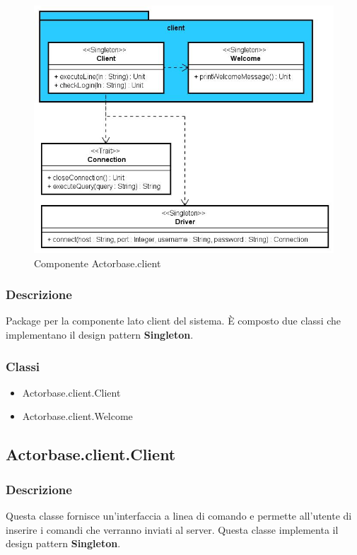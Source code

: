 \documentclass[a4paper]{article}
\begin{document}
			\begin{figure}[H]
				\centering
				\includegraphics[width=\textwidth]{ST/Client/clientLevel.jpg}
				\caption{Componente Actorbase.client}
			\end{figure}
			\subsubsection{Descrizione}
				Package per la componente lato client del sistema. 
				È composto due classi che implementano il design pattern \textbf{Singleton}.
				
			\subsubsection{Classi}
				\begin{itemize}
					\item Actorbase.client.Client
					\item Actorbase.client.Welcome
				\end{itemize}
				
		\subsection{Actorbase.client.Client}
			\subsubsection{Descrizione}
				Questa classe fornisce un'interfaccia a linea di comando e permette all'utente di inserire i comandi che verranno inviati al server. 
				Questa classe implementa il design pattern \textbf{Singleton}.
				
\end{document}
